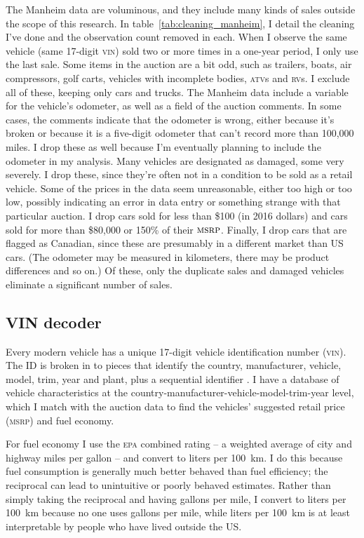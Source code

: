 \documentclass[11pt,letterpaper,oneside]{article}
\newcommand{\msrp}{\textsc{msrp}}
\newcommand{\vin}{\textsc{vin}}
\begin{document}
\begin{doublespacing}
The Manheim data are voluminous, and they include many kinds of sales outside the scope of this research.
In table~\ref{tab:cleaning_manheim}, I detail the cleaning I've done and the observation count removed in each.
When I observe the same vehicle (same 17-digit \vin{}) sold two or more times in a one-year period, I only use the last sale.
Some items in the auction are a bit odd, such as trailers, boats, air compressors, golf carts, vehicles with incomplete bodies, \textsc{atv}s and \textsc{rv}s.
I exclude all of these, keeping only cars and trucks.
The Manheim data include a variable for the vehicle's odometer, as well as a field of the auction comments.
In some cases, the comments indicate that the odometer is wrong, either because it's broken or because it is a five\hyp{}digit odometer that can't record more than 100,000 miles.
I drop these as well because I'm eventually planning to include the odometer in my analysis.
Many vehicles are designated as damaged, some very severely.  I drop these, since they're often not in a condition to be sold as a retail vehicle.
Some of the prices in the data seem unreasonable, either too high or too low, possibly indicating an error in data entry or something strange with that particular auction.
I drop cars sold for less than \$100 (in 2016 dollars) and cars sold for more than \$80,000 or 150\% of their $\textsc{msrp}$.
Finally, I drop cars that are flagged as Canadian, since these are presumably in a different market than US cars.
(The odometer may be measured in kilometers, there may be product differences and so on.)
Of these, only the duplicate sales and damaged vehicles eliminate a significant number of sales.


\subsection{VIN decoder}

Every modern vehicle has a unique 17-digit vehicle identification number (\vin{}).
The ID is broken in to pieces that identify the country, manufacturer, vehicle, model, trim, year and plant, plus a sequential identifier \parencite{vin_details}.
I have a database of vehicle characteristics at the country\hyp{}manufacturer\hyp{}vehicle\hyp{}model\hyp{}trim\hyp{}year level, which I match with the auction data to find the vehicles' suggested retail price (\msrp{}) and fuel economy.

For fuel economy I use the \textsc{epa} combined rating -- a weighted average of city and highway miles per gallon -- and convert to liters per 100~km.
I do this because fuel consumption is generally much better behaved than fuel efficiency; the reciprocal can lead to unintuitive or poorly behaved estimates.
Rather than simply taking the reciprocal and having gallons per mile, I convert to liters per 100~km because no one uses gallons per mile, while liters per 100~km is at least interpretable by people who have lived outside the US\@.


\end{doublespacing}
\end{document}

